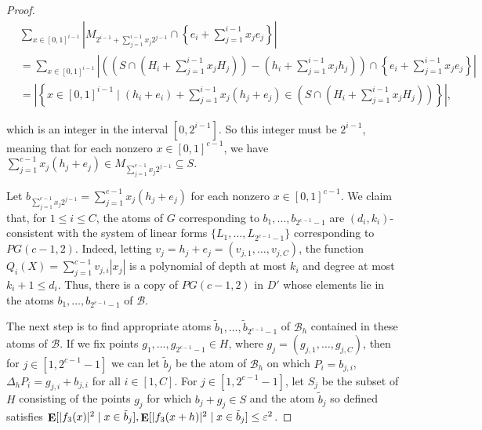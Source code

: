 \documentclass{article}
\theoremstyle{plain}
\theoremstyle{definition}
\theoremstyle{definition}
\theoremstyle{remark}
\numberwithin{equation}{section}
\newcommand{\Esymb}{{\bf E}}
\DeclareMathOperator*{\E}{\Esymb}
\newcommand{\cB}{\mathcal B}
\begin{document}
\begin{proof}
\begin{align*}
    & \sum_{x\in[0,1]^{i-1}} \left | M_{2^{i-1}+\sum_{j=1}^{i-1} x_j 2^{j-1}}\cap \left \{ e_i + \sum_{j=1}^{i-1} x_j e_j \right \} \right | \\
    & = \sum_{x\in[0,1]^{i-1}} \left | \left(\left(S\cap \left(H_i+\sum_{j=1}^{i-1} x_j H_j\right)\right) - \left(h_i + \sum_{j=1}^{i-1} x_j h_j\right)\right) \cap \left \{ e_i + \sum_{j=1}^{i-1} x_j e_j \right \} \right | \\
    & = \left |\left\{x\in [0,1]^{i-1} \mid (h_i+e_i) + \sum_{j=1}^{i-1} x_j (h_j + e_j) \in \left(S\cap \left(H_i+\sum_{j=1}^{i-1} x_j H_j\right)\right)\right\}\right |,
\end{align*}

\noindent which is an integer in the interval $[0,2^{i-1}]$. So this integer must be $2^{i-1}$, meaning that for each nonzero $x\in [0,1]^{c-1}$, we have $\sum_{j=1}^{c-1} x_j (h_j + e_j) \in M_{\sum_{j=1}^{c-1} x_j 2^{j-1}}\subseteq S$.

Let $b_{\sum_{j=1}^{c-1} x_j 2^{j-1}}=\sum_{j=1}^{c-1} x_j (h_j + e_j)$ for each nonzero $x\in [0,1]^{c-1}$. We claim that, for $1\leq i\leq C$, the atoms of $G$ corresponding to $b_1,\dots,b_{2^{c-1}-1}$ are $(d_i,k_i)$-consistent with the system of linear forms $\{L_1,\dots,L_{2^{c-1}-1}\}$ corresponding to $PG(c-1,2)$. Indeed, letting $v_j=h_j+e_j=(v_{j,1},\dots,v_{j,C})$, the function $Q_i(X)=\sum_{j=1}^{c-1} v_{j,i}|x_j|$ is a polynomial of depth at most $k_i$ and degree at most $k_i+1\leq d_i$. Thus, there is a copy of $PG(c-1,2)$ in $D'$ whose elements lie in the atoms $b_1,\dots,b_{2^{c-1}-1}$ of $\cB$.

The next step is to find appropriate atoms $\tilde b_1,\dots,\tilde b_{2^{c-1}-1}$ of $\cB_h$ contained in these atoms of $\cB$. If we fix points $g_1,\dots,g_{2^{c-1}-1}\in H$, where $g_j=(g_{j,1},\dots,g_{j,C})$, then for $j\in [1,2^{c-1}-1]$ we can let $\tilde b_j$ be the atom of $\cB_h$ on which $P_i = b_{j,i}$, $\Delta_h P_i = g_{j,i}+b_{j,i}$ for all $i\in [1,C]$. For $j\in [1,2^{c-1}-1]$, let $S_j$ be the subset of $H$ consisting of the points $g_j$ for which $b_j+g_j\in S$ and the atom $\tilde b_j$ so defined satisfies $\E[|f_3(x)|^2 \mid x\in \tilde b_j],\E[|f_3(x+h)|^2 \mid x\in \tilde b_j]\leq \varepsilon^2$.


\end{proof}
\end{document}
